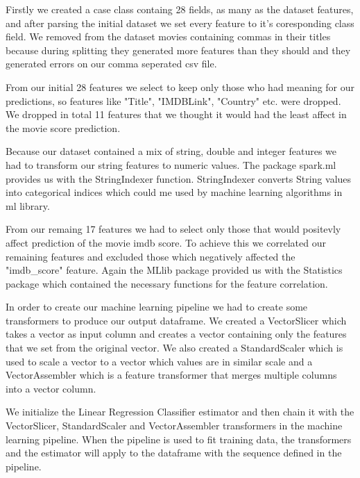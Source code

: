 \documentclass[letterpaper,twocolumn,10pt]{article}
\begin{document}
Firstly we created a case class containg 28 fields, as many as the dataset features, and after parsing the initial dataset we set every feature to it's coresponding class field. We removed from the dataset movies containing commas in their titles because during splitting they generated more features than they should and they generated errors on our comma seperated csv file.\par 

From our initial 28 features we select to keep only those who had meaning for our predictions, so features like "Title", "IMDBLink", "Country" etc. were dropped. We dropped in total 11 features that we thought it would had the least affect in the movie score prediction. \par 

Because our dataset contained a mix of string, double and integer features we had to transform our string features to numeric values. The package spark.ml provides us with the StringIndexer function. StringIndexer converts String values into categorical indices which could me used by machine learning algorithms in ml library.\par 

From our remaing 17 features we had to select only those that would positevly affect prediction of the movie imdb score. To achieve this we correlated our remaining features and excluded those which negatively affected the "imdb\_score" feature. Again the MLlib package provided us with the Statistics package which contained the necessary functions for the feature correlation.\par 

In order to create our machine learning pipeline we had to create some transformers to produce our output dataframe. We created a VectorSlicer which takes a vector as input column and creates a vector containing only the features that we set from the original vector. We also created a StandardScaler which is used to scale a vector to a vector which values are in similar scale and a VectorAssembler which is a feature transformer that merges multiple columns into a vector column.\par 

We initialize the Linear Regression Classifier estimator and then chain it with the VectorSlicer, StandardScaler and VectorAssembler transformers in the machine learning pipeline. When the pipeline is used to fit training data, the transformers and the estimator will apply to the dataframe with the sequence defined in the pipeline.\par 
\end{document}
